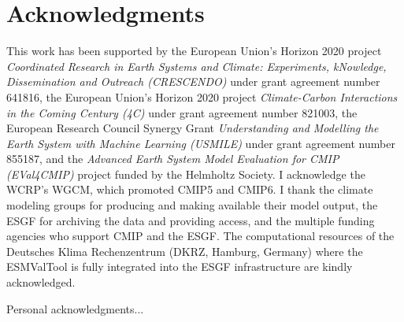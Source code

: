 
%



\chapter{Acknowledgments}

This work has been supported by the European Union's Horizon 2020 project
\emph{Coordinated Research in Earth Systems and Climate: Experiments,
  kNowledge, Dissemination and Outreach (CRESCENDO)} under grant agreement
number 641816, the European Union's Horizon 2020 project \emph{Climate-Carbon
  Interactions in the Coming Century (4C)} under grant agreement number 821003,
the European Research Council Synergy Grant \emph{Understanding and Modelling
  the Earth System with Machine Learning (USMILE)} under grant agreement number
855187, and the \emph{Advanced Earth System Model Evaluation for CMIP
  (EVal4CMIP)} project funded by the Helmholtz Society. I acknowledge the
\acs{WCRP}'s \ac{WGCM}, which promoted \acs{CMIP}5 and \acs{CMIP}6. I thank the
climate modeling groups for producing and making available their model output,
the \ac{ESGF} for archiving the data and providing access, and the multiple
funding agencies who support \ac{CMIP} and the \ac{ESGF}. The computational
resources of the Deutsches Klima Rechenzentrum (DKRZ, Hamburg, Germany) where
the \ac{ESMValTool} is fully integrated into the \ac{ESGF} infrastructure are
kindly acknowledged.

Personal acknowledgments...
